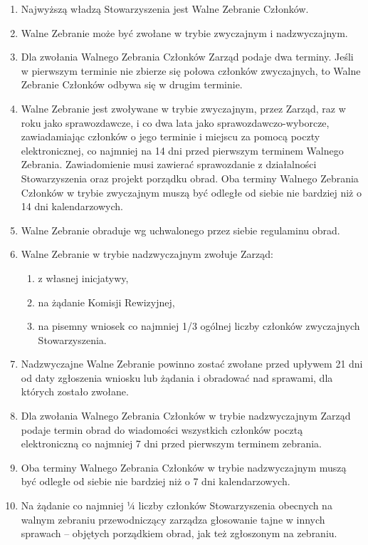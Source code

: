 \documentclass{article}
\begin{document}
\begin{enumerate}
\item
  Najwyższą władzą Stowarzyszenia jest Walne Zebranie Członków.
\item
  Walne Zebranie może być zwołane w trybie zwyczajnym i nadzwyczajnym.
\item
  Dla zwołania Walnego Zebrania Członków Zarząd podaje dwa terminy. Jeśli w pierwszym terminie nie zbierze się połowa członków zwyczajnych, to Walne Zebranie Członków odbywa się w drugim terminie.
\item
  Walne Zebranie jest zwoływane w trybie zwyczajnym, przez Zarząd, raz w roku jako sprawozdawcze, i co dwa lata jako sprawozdawczo-wyborcze, zawiadamiając członków o jego terminie i miejscu za pomocą poczty elektronicznej, co najmniej na 14 dni przed pierwszym terminem Walnego Zebrania. Zawiadomienie musi zawierać sprawozdanie z działalności Stowarzyszenia oraz projekt porządku obrad. Oba terminy Walnego Zebrania Członków w trybie zwyczajnym muszą być odległe od siebie nie bardziej niż o 14 dni kalendarzowych.
\item
  Walne Zebranie obraduje wg uchwalonego przez siebie regulaminu obrad.
\item
  Walne Zebranie w trybie nadzwyczajnym zwołuje Zarząd:
  \begin{enumerate}
  \def\labelenumii{\alph{enumii}.}
  \item
    z własnej inicjatywy,
  \item
    na żądanie Komisji Rewizyjnej,
  \item
    na pisemny wniosek co najmniej 1/3 ogólnej liczby członków zwyczajnych Stowarzyszenia.
  \end{enumerate}
\item
  Nadzwyczajne Walne Zebranie powinno zostać zwołane przed upływem 21 dni od daty zgłoszenia wniosku lub żądania i obradować nad sprawami, dla których zostało zwołane.
\item
  Dla zwołania Walnego Zebrania Członków w trybie nadzwyczajnym Zarząd podaje termin obrad do wiadomości wszystkich członków pocztą elektroniczną co najmniej 7 dni przed pierwszym terminem zebrania.
\item
  Oba terminy Walnego Zebrania Członków w trybie nadzwyczajnym muszą być odległe od siebie nie bardziej niż o 7 dni kalendarzowych.
\item
  Na żądanie co najmniej 1⁄4 liczby członków Stowarzyszenia obecnych na walnym zebraniu przewodniczący zarządza głosowanie tajne w innych sprawach -- objętych porządkiem obrad, jak też zgłoszonym na zebraniu.
\end{enumerate}
\end{document}
